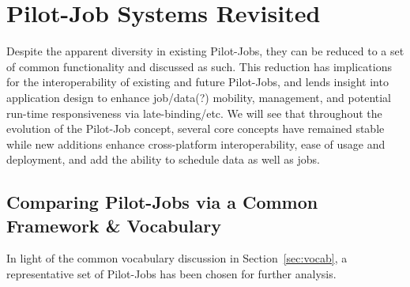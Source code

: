 \documentclass{sig-alternate}
\begin{document}



\section{Pilot-Job Systems Revisited}
Despite the apparent diversity in existing Pilot-Jobs,
they can be reduced to a set of common functionality and
discussed as such.  This reduction has implications
for the interoperability of existing and future Pilot-Jobs, and
lends insight into application design to enhance job/data(?)
mobility, management, and potential run-time responsiveness via
late-binding/etc.  We will see that throughout the evolution
of the Pilot-Job concept, several core concepts have remained stable
while new additions enhance cross-platform interoperability,
ease of usage and deployment, and add the ability to
schedule data as well as jobs. 

\subsection{Comparing Pilot-Jobs via a Common Framework \& Vocabulary}

In light of the common vocabulary discussion in 
Section~\ref{sec:vocab}, a representative set of Pilot-Jobs
has been chosen for further analysis.  
\end{document}
